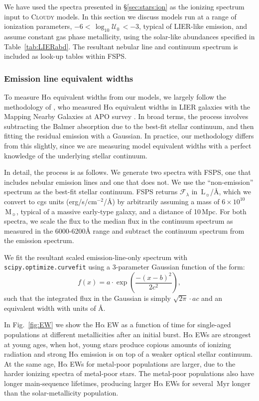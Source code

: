 \documentclass[preprint2]{aastex62}
\newcommand{\FSPS}{{\sc FSPS}\xspace}
\newcommand{\Cloudy}{\textsc{Cloudy}\xspace}
\newcommand\Lsun{\ensuremath{\,\mathrm{L_{\sun}}}\xspace}
\newcommand\Msun{\ensuremath{\,\mathrm{M_{\sun}}}\xspace}
\newcommand{\ha}{\ensuremath{\mathrm{H\alpha}}\xspace}
\newcommand{\logten}{\ensuremath{\log_{10}}}
\newcommand{\ang}{\ensuremath{\mbox{\AA}}\xspace}
\newcommand{\logU}{\ensuremath{\logten \mathcal{U}_0}}
\newcommand{\Myr}{$\,$Myr\xspace}
\begin{document}
We have used the spectra presented in \S\ref{sec:stars:ion} as the ionizing spectrum input to \Cloudy models. In this section we discuss models run at a range of ionization parameters, $-6<\,$\logU$\,<-3$, typical of LIER-like emission, and assume constant gas phase metallicity, using the solar-like abundances specified in Table~\ref{tab:LIERabd}. The resultant nebular line and continuum spectrum is included as look-up tables within \FSPS.

\subsubsection{Emission line equivalent widths} \label{sec:stars:EW}

To measure \ha equivalent widths from our models, we largely follow the methodology of \citet{Belfiore+2016}, who measured \ha equivalent widths in LIER galaxies with the Mapping Nearby Galaxies at APO survey \citep[MaNGA; ][]{Bundy+2015}. In broad terms, the process involves subtracting the Balmer absorption due to the best-fit stellar continuum, and then fitting the residual emission with a Gaussian. In practice, our methodology differs from this slightly, since we are measuring model equivalent widths with a perfect knowledge of the underlying stellar continuum.

In detail, the process is as follows. We generate two spectra with \FSPS, one that includes nebular emission lines and one that does not. We use the ``non-emission'' spectrum as the best-fit stellar continuum. \FSPS returns $\mathcal{F}_{\lambda}$ in \Lsun/\ang, which we convert to cgs units (erg/s/cm$^{-2}$/\ang) by arbitrarily assuming a mass of $6 \times 10^{10}$\Msun, typical of a massive early-type galaxy, and a distance of 10$\,$Mpc. For both spectra, we scale the flux to the median flux in the continuum spectrum as measured in the 6000-6200\ang range and subtract the continuum spectrum from the emission spectrum. 

We fit the resultant scaled emission-line-only spectrum with \texttt{scipy.optimize.curvefit} \citep{SciPy} using a 3-parameter Gaussian function of the form:
\begin{equation}
    f(x) = a \cdot \exp \left( \frac{-(x-b)^2}{2c^2} \right),
\end{equation}
such that the integrated flux in the Gaussian is simply $\sqrt{2\pi} \cdot ac$ and an equivalent width with units of \ang.

In Fig.~\ref{fig:EW} we show the \ha EW as a function of time for single-aged populations at different metallicities after an initial burst. \ha EWs are strongest at young ages, when hot, young stars produce copious amounts of ionizing radiation and strong \ha emission is on top of a weaker optical stellar continuum. At the same age, \ha EWs for metal-poor populations are larger, due to the harder ionizing spectra of metal-poor stars. The metal-poor populations also have longer main-sequence lifetimes, producing larger \ha EWs for several \Myr longer than the solar-metallicity population.
\end{document}
